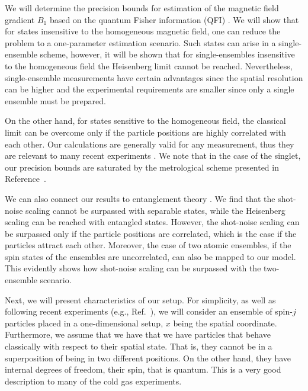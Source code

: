
We will determine the precision bounds for estimation of the magnetic field gradient $B_1$ based on the quantum Fisher information (QFI) \cite{Paris2009,Braunstein1994,Holevo1982,Helstrom1976,Petz2002,Petz2008}.
We will show that for states insensitive to the homogeneous magnetic field, one can reduce the problem to a one-parameter estimation scenario.
Such states can arise in a single-ensemble scheme, however, it will be shown that for single-ensembles insensitive to the homogeneous field the Heisenberg limit cannot be reached.
Nevertheless, single-ensemble measurements have certain advantages since the spatial resolution can be higher and the experimental requirements are smaller since only a single ensemble must be prepared.

On the other hand, for states sensitive to the homogeneous field, the classical limit can be overcome only if the particle positions are highly correlated with each other.
Our calculations are generally valid for any measurement, thus they are relevant to many recent experiments \cite{Wasilewski2010,Eckert2006,Wildermuth2006, Wolfgramm2010,Koschorreck2011,Vengalattore2007,Zhou2010,Behbood2013}.
We note that in the case of the singlet, our precision bounds are saturated by the metrological scheme presented in Reference~\cite{Urizar-lanz2013}.

We can also connect our results to entanglement theory \cite{Werner1989,Horodecki2009,Guehne2009}.
We find that the shot-noise scaling cannot be surpassed with separable states, while the Heisenberg scaling can be reached with entangled states.
However, the shot-noise scaling can be surpassed only if the particle positions are correlated, which is the case if the particles attract each other.
Moreover, the case of two atomic ensembles, if the spin states of the ensembles are uncorrelated, can also be mapped to our model.
This evidently shows how shot-noise scaling can be surpassed with the two-ensemble scenario.

Next, we will present characteristics of our setup.
For simplicity, as well as following  recent experiments (e.g., Ref.~\cite{Koschorreck2011}), we will consider an ensemble of spin-$j$ particles placed in a one-dimensional setup, $x$ being the spatial coordinate.
Furthermore, we assume that we have that we have particles that behave classically with respect to their spatial state.
That is, they cannot be in a superposition of being in two different positions.
On the other hand, they have internal degrees of freedom, their spin, that is quantum. This is a very good description to many of the cold gas experiments.

